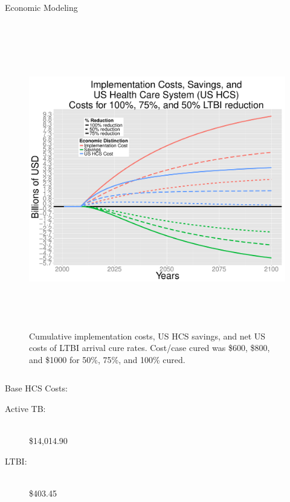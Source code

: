 \documentclass[final]{beamer}
\begin{document}
\begin{frame}
\begin{columns}
\begin{column}{.3\textwidth}
\begin{block}{Economic Modeling}
\begin{block}{}
          \vspace{-4em}
          \begin{column}{.66\textwidth}
            \begin{figure}[h]
              \begin{center}
                \includegraphics[width=\textwidth,height=13cm]{EnLTBIRedGroupCost.pdf}
              \end{center}
              \caption{Cumulative implementation costs, US HCS savings, and net
                       US costs of LTBI arrival cure rates. Cost/case cured was
                       \$600, \$800, and \$1000 for 50\%, 75\%, and 100\%
                       cured.}
              \label{fig:redEnLTBI_costs}
            \end{figure}
          \end{column}
          \begin{column}{.26\textwidth}
            Base HCS Costs:
            \begin{description}
              \item[Active TB:]\hfill \\ 
                \$14,014.90
              \item[LTBI:]\hfill \\ 
                \$403.45
            \end{description}

\end{column}
\end{block}
\end{block}
\end{column}
\end{columns}
\end{frame}
\end{document}

